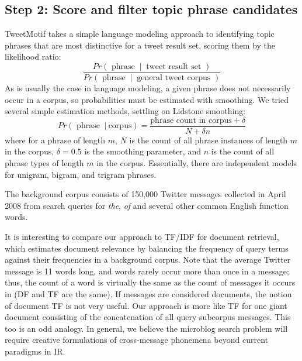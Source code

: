 \documentclass[letterpaper]{article}
\newcommand{\bto}[1]{\textcolor{blue}{\textbf{[#1 --BTO]}}}
\newcommand{\codenote}[1]{}
\begin{document}

\subsection{Step 2: Score and filter topic phrase candidates}
\codenote{lang_model.py, ranking.py}
TweetMotif takes a simple language modeling approach to identifying topic phrases that are most distinctive for a tweet result set, scoring them by the likelihood ratio:
\[\frac{Pr(\textrm{ phrase } \ |\ \textrm{ tweet result set })}
{Pr(\textrm{ phrase } \ |\ \textrm{ general tweet corpus })}
\]
As is usually the case in language modeling, a given phrase does not necessarily occur in a corpus, so probabilities must be estimated with smoothing.  We tried several simple estimation methods, settling on Lidstone smoothing:
\[ Pr(\textrm{ phrase }\ |\ \textrm{corpus}) = \frac
{ \textrm{phrase count in corpus} + \delta }
{ N + \delta n }
\]
where for a phrase of length $m$, $N$ is the count of all phrase instances of length $m$ in the corpus, $\delta=0.5$ is the smoothing parameter, and $n$ is the count of all phrase types of length $m$ in the corpus.  Essentially, there are independent models for unigram, bigram, and trigram phrases.


The background corpus consists of 150,000 Twitter messages collected in April 2008 from search queries for \emph{the}, \emph{of} and several other common English function words.

It is interesting to compare our approach to TF/IDF for document retrieval, which estimates document relevance by balancing the frequency of query terms against their frequencies in a background corpus.  Note that the average Twitter message is 11 words long, and words rarely occur more than once in a message; thus, the count of a word is virtually the same as the count of messages it occurs in (DF and TF are the same).  If messages are considered documents, the notion of document TF is not very useful.  Our approach is more like TF for one giant document consisting of the concatenation of all query subcorpus messages.  This too is an odd analogy.  In general, we believe the microblog search problem will require creative formulations of cross-message phonemena beyond current paradigms in IR.
\end{document}
